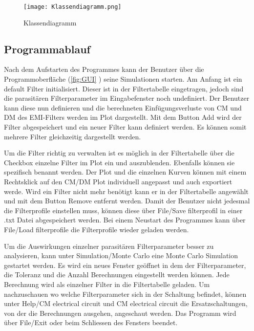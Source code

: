 \begin{figure}[H]
	\centering
	\texttt{[image: Klassendiagramm.png]}
	\caption{Klassendiagramm}
	\label{fig:Klassendiagramm}
\end{figure} 

\newpage

\subsection{Programmablauf} \label{subsec:programmablauf}


Nach dem Aufstarten des Programmes kann der Benutzer über die Programmoberfläche (\ref{fig:GUI} ) seine Simulationen starten.
Am Anfang ist ein default Filter initialisiert. Dieser ist in der Filtertabelle eingetragen, jedoch sind die parasitären Filterparameter im Eingabefenster noch undefiniert. Der Benutzer kann diese nun definieren und die berechneten Einfügungsverluste von CM und DM des EMI-Filters werden im Plot dargestellt. Mit dem Button Add wird der Filter abgespeichert und ein neuer Filter kann definiert werden. Es können somit mehrere Filter gleichzeitig dargestellt werden. 

Um die Filter richtig zu verwalten ist es möglich in der Filtertabelle über die Checkbox einzelne Filter im Plot ein und auszublenden. Ebenfalls können sie spezifisch benannt werden. Der Plot und die einzelnen Kurven können mit einem Rechtsklick auf den CM/DM Plot individuell angepasst und auch exportiert werde. Wird ein Filter nicht mehr benötigt kann er in der Filtertabelle angewählt und mit dem Button Remove entfernt werden. Damit der Benutzer nicht jedesmal die Filterprofile einstellen muss, können diese über File/Save filterprofil in einer .txt Datei abgespeichert werden. Bei einem Neustart des Programmes kann über File/Load filterprofile die Filterprofile wieder geladen werden. 

Um die Auswirkungen einzelner parasitären Filterparameter besser zu analysieren, kann unter Simulation/Monte Carlo eine Monte Carlo Simulation gestartet werden. Es wird ein neues Fenster geöffnet in dem der Filterparameter, die Toleranz und die Anzahl Berechnungen eingestellt werden können. Jede Berechnung wird als einzelner Filter in die Filtertabelle geladen. Um nachzuschauen wo welche Filterparameter sich in der Schaltung befindet, können unter Help/CM electrical circuit und CM electrical circuit die Ersatzschaltungen, von der die Berechnungen ausgehen, angeschaut werden. Das Programm wird über File/Exit oder beim Schliessen des Fensters beendet.
 

